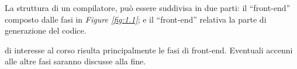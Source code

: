 \documentclass{subfiles}
\begin{document}
La struttura di un compilatore, può essere suddivisa in due parti: il ``front-end'' composto dalle fasi in \emph{Figure \ref{fig:1.1}};
e il ``front-end'' relativa la parte di generazione del codice.


\begin{Note*}
    di interesse al corso risulta principalmente le fasi di front-end.
    Eventuali accenni alle altre fasi saranno discusse alla fine.
\end{Note*}
\end{document}
